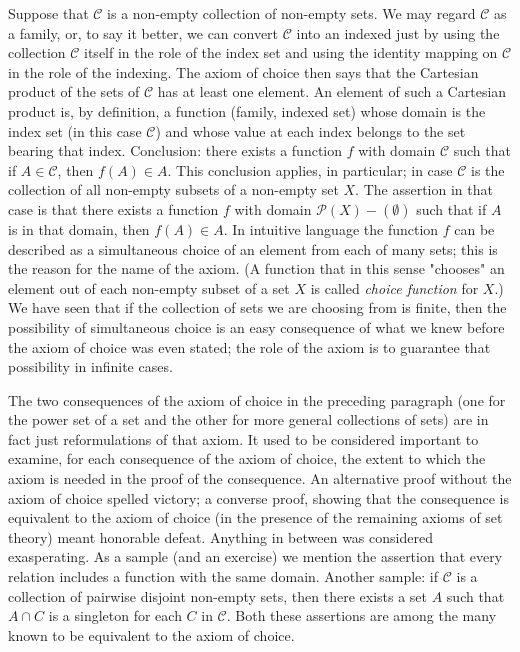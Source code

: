 Suppose that $\mathcal{C}$ is a non-empty collection of non-empty sets. We may regard $\mathcal{C}$ as a family, or, to say it better, we can convert $\mathcal{C}$ into an indexed just by using the collection $\mathcal{C}$ itself in the role of the index set and using the identity mapping on $\mathcal{C}$ in the role of the indexing. The axiom of choice then says that the Cartesian product of the sets of $\mathcal{C}$ has at least one element. An element of such a Cartesian product is, by definition, a function (family, indexed set) whose domain is the index set (in this case $\mathcal{C}$) and whose value at each index belongs to the set bearing that index. Conclusion: there exists a function $f$ with domain $\mathcal{C}$ such that if $A \in \mathcal{C}$, then $f(A) \in A$. This conclusion applies, in particular; in case $\mathcal{C}$ is the collection of all non-empty subsets of a non-empty set $X$. The assertion in that case is that there exists a function $f$ with domain $\mathcal{P}(X) - ( \emptyset )$ such that if $A$ is in that domain, then $f(A) \in A$. In intuitive language the function $f$ can be described as a simultaneous choice of an element from each of many sets; this is the reason for the name of the axiom. (A function that in this sense "chooses" an element out of each non-empty subset of a set $X$ is called \textit{choice function} for $X$.) We have seen that if the collection of sets we are choosing from is finite, then the possibility of simultaneous choice is an easy consequence of what we knew before the axiom of choice was even stated; the role of the axiom is to guarantee that possibility in infinite cases. 

The two consequences of the axiom of choice in the preceding paragraph (one for the power set of a set and the other for more general collections of sets) are in fact just reformulations of that axiom. It used to be considered important to examine, for each consequence of the axiom of choice, the extent to which the axiom is needed in the proof of the consequence. An alternative proof without the axiom of choice spelled victory; a converse proof, showing that the consequence is equivalent to the axiom of choice (in the presence of the remaining axioms of set theory) meant honorable defeat. Anything in between was considered exasperating. As a sample (and an exercise) we mention the assertion that every relation includes a function with the same domain. Another sample: if $\mathcal{C}$ is a collection of pairwise disjoint non-empty sets, then there exists a set $A$ such that $A \cap C$ is a singleton for each $C$ in $\mathcal{C}$. Both these assertions are among the many known to be equivalent to the axiom of choice. 

